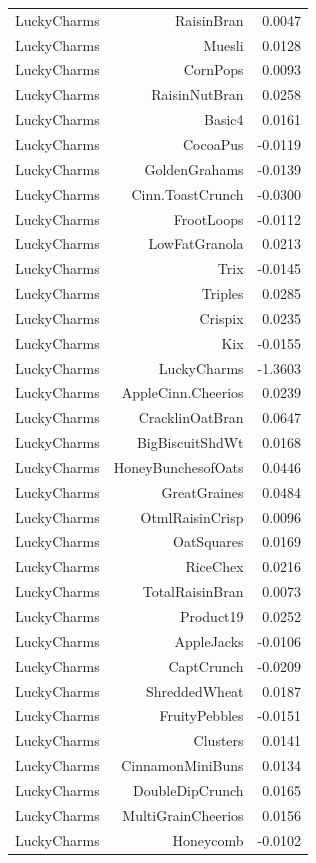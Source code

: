 \begin{longtable}{@{}lrr@{}}
LuckyCharms & RaisinBran & 0.0047 \\
LuckyCharms & Muesli & 0.0128 \\
LuckyCharms & CornPops & 0.0093 \\
LuckyCharms & RaisinNutBran & 0.0258 \\
LuckyCharms & Basic4 & 0.0161 \\
LuckyCharms & CocoaPus & -0.0119 \\
LuckyCharms & GoldenGrahams & -0.0139 \\
LuckyCharms & Cinn.ToastCrunch & -0.0300 \\
LuckyCharms & FrootLoops & -0.0112 \\
LuckyCharms & LowFatGranola & 0.0213 \\
LuckyCharms & Trix & -0.0145 \\
LuckyCharms & Triples & 0.0285 \\
LuckyCharms & Crispix & 0.0235 \\
LuckyCharms & Kix & -0.0155 \\
LuckyCharms & LuckyCharms & -1.3603 \\
LuckyCharms & AppleCinn.Cheerios & 0.0239 \\
LuckyCharms & CracklinOatBran & 0.0647 \\
LuckyCharms & BigBiscuitShdWt & 0.0168 \\
LuckyCharms & HoneyBunchesofOats & 0.0446 \\
LuckyCharms & GreatGraines & 0.0484 \\
LuckyCharms & OtmlRaisinCrisp & 0.0096 \\
LuckyCharms & OatSquares & 0.0169 \\
LuckyCharms & RiceChex & 0.0216 \\
LuckyCharms & TotalRaisinBran & 0.0073 \\
LuckyCharms & Product19 & 0.0252 \\
LuckyCharms & AppleJacks & -0.0106 \\
LuckyCharms & CaptCrunch & -0.0209 \\
LuckyCharms & ShreddedWheat & 0.0187 \\
LuckyCharms & FruityPebbles & -0.0151 \\
LuckyCharms & Clusters & 0.0141 \\
LuckyCharms & CinnamonMiniBuns & 0.0134 \\
LuckyCharms & DoubleDipCrunch & 0.0165 \\
LuckyCharms & MultiGrainCheerios & 0.0156 \\
LuckyCharms & Honeycomb & -0.0102 \\

\end{longtable}
